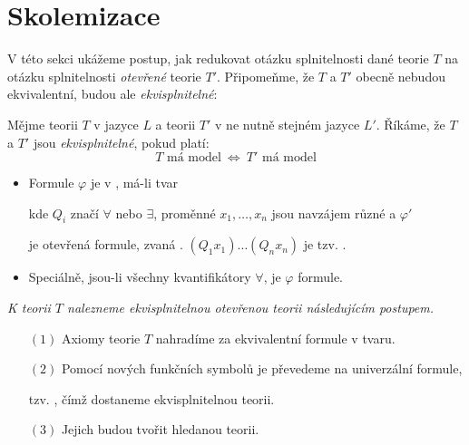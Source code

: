 \section{Skolemizace}\label{section:skolemization}
\todo

V této sekci ukážeme postup, jak redukovat otázku splnitelnosti dané teorie $T$ na otázku splnitelnosti \emph{otevřené} teorie $T'$. Připomeňme, že $T$ a $T'$ obecně nebudou ekvivalentní, budou ale \emph{ekvisplnitelné}:

\begin{definition}[Ekvisplnitelnost]
Mějme teorii $T$ v jazyce $L$ a teorii $T'$ v ne nutně stejném jazyce $L'$. Říkáme, že $T$ a $T'$ jsou \emph{ekvisplnitelné}, 
pokud platí: 
$$
\text{$T$ má model}\ \Leftrightarrow\ \text{$T'$ má model}
$$
\end{definition}




    \begin{itemize}

    
    \item Formule $\varphi$ je v , má-li tvar
    \vspace{-2mm}
    
    \vspace{-6mm}
    kde $Q_i$ značí $\forall$ nebo $\exists$, proměnné $x_1,\dots,x_n$ jsou navzájem různé a $\varphi'$
    \smallskip
    
    je otevřená formule, zvaná . $(Q_1x_1)\dots(Q_nx_n)$ je tzv. .
    \smallskip
    
    \item Speciálně, jsou-li všechny kvantifikátory $\forall$, je $\varphi$  formule.
    \end{itemize}
    \medskip
    
    {\it K teorii $T$ nalezneme ekvisplnitelnou otevřenou teorii následujícím postupem.}
    \vspace{0.5mm}
    
    \begin{enumerate}
    \item[$(1)$] Axiomy teorie $T$ nahradíme za ekvivalentní formule v  tvaru.
    \smallskip
    
    \item[$(2)$] Pomocí nových funkčních symbolů je převedeme na univerzální formule,
    \smallskip
    
    tzv. , čímž dostaneme ekvisplnitelnou teorii.
    \smallskip
    
    \item[$(3)$] Jejich  budou tvořit hledanou teorii.
    \end{enumerate}
    
